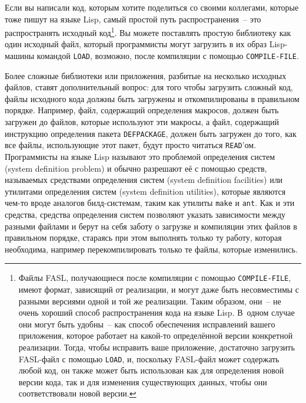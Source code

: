 Если вы написали код, которым хотите поделиться со своими коллегами, которые тоже пишут на
языке Lisp, самый простой путь распространения~-- это распространять исходный
код\footnote{Файлы FASL, получающиеся после компиляции с помощью \lstinline{COMPILE-FILE},
  имеют формат, зависящий от реализации, и могут даже быть несовместимы с разными версиями
  одной и той же реализации. Таким образом, они~-- не очень хороший способ распространения
  кода на языке Lisp. В~одном случае они могут быть удобны~-- как способ обеспечения
  исправлений вашего приложения, которое работает на какой-то определённой версии
  конкретной реализации. Тогда, чтобы исправить ваше приложение, достаточно загрузить
  FASL-файл с помощью \lstinline{LOAD}, и, поскольку FASL-файл может содержать любой код, он
  также может быть использован как для определения новой версии кода, так и для изменения
  существующих данных, чтобы они соответствовали новой версии.}. Вы можете поставлять
простую библиотеку как один исходный файл, который программисты могут загрузить в их образ
Lisp-машины командой \lstinline{LOAD}, возможно, после компиляции с помощью
\lstinline{COMPILE-FILE}.

Более сложные библиотеки или приложения, разбитые на несколько исходных файлов, ставят
дополнительный вопрос: для того чтобы загрузить сложный код, файлы исходного кода должны
быть загружены и откомпилированы в правильном порядке. Например, файл, содержащий
определения макросов, должен быть загружен до файлов, которые используют эти макросы, а
файл, содержащий инструкцию определения пакета \lstinline{DEFPACKAGE}, должен быть загружен до
того, как все файлы, использующие этот пакет, будут просто читаться
\lstinline{READ}'ом. Программисты на языке Lisp называют это проб\-ле\-мой определения систем
(system definition problem) и обычно разрешают её с по\-мощью средств, называемых средствами
определения систем (system definition facilities) или утилитами определения систем (system
definition utilities), которые являются чем-то вроде аналогов билд-системам, таким как
утилиты \lstinline{make} и \lstinline{ant}. Как и эти средства, средства определения систем
позволяют указать зависимости между разными файлами и берут на себя заботу о загрузке и
компиляции этих файлов в правильном порядке, стараясь при этом выполнять только ту работу,
которая необходима, например перекомпилировать только те файлы, которые изменились.

